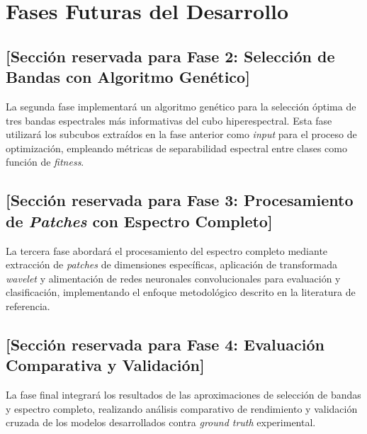 \section{Fases Futuras del Desarrollo}

\subsection{[Sección reservada para Fase 2: Selección de Bandas con Algoritmo Genético]}

La segunda fase implementará un algoritmo genético para la selección óptima de tres bandas espectrales más informativas del cubo hiperespectral. Esta fase utilizará los subcubos extraídos en la fase anterior como \emph{input} para el proceso de optimización, empleando métricas de separabilidad espectral entre clases como función de \emph{fitness}.

\subsection{[Sección reservada para Fase 3: Procesamiento de \emph{Patches} con Espectro Completo]}

La tercera fase abordará el procesamiento del espectro completo mediante extracción de \emph{patches} de dimensiones específicas, aplicación de transformada \emph{wavelet} y alimentación de redes neuronales convolucionales para evaluación y clasificación, implementando el enfoque metodológico descrito en la literatura de referencia.

\subsection{[Sección reservada para Fase 4: Evaluación Comparativa y Validación]}

La fase final integrará los resultados de las aproximaciones de selección de bandas y espectro completo, realizando análisis comparativo de rendimiento y validación cruzada de los modelos desarrollados contra \emph{ground truth} experimental.
